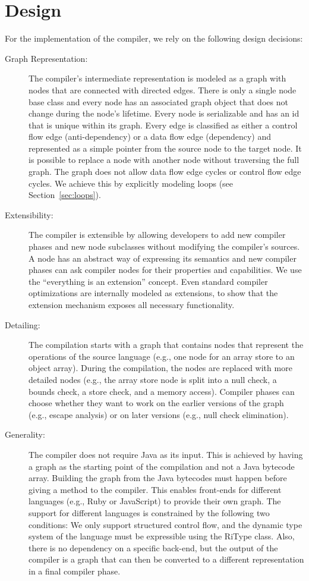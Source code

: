 \documentclass[twocolumn]{svjour3}
\begin{document}
\section{Design}
For the implementation of the compiler, we rely on the following design decisions:
\begin{description}
\item[Graph Representation:]
The compiler's intermediate representation is modeled as a graph with nodes that are connected with directed edges.
There is only a single node base class and every node has an associated graph object that does not change during the node's lifetime.
Every node is serializable and has an id that is unique within its graph.
Every edge is classified as either a control flow edge (anti-dependency) or a data flow edge (dependency) and represented as a simple pointer from the source node to the target node.
It is possible to replace a node with another node without traversing the full graph.
The graph does not allow data flow edge cycles or control flow edge cycles.
We achieve this by explicitly modeling loops (see Section~\ref{sec:loops}). 
\item[Extensibility:]
The compiler is extensible by allowing developers to add new compiler phases and new node subclasses without modifying the compiler's sources.
A node has an abstract way of expressing its semantics and new compiler phases can ask compiler nodes for their properties and capabilities.
We use the ``everything is an extension'' concept.
Even standard compiler optimizations are internally modeled as extensions, to show that the extension mechanism exposes all necessary functionality.
\item[Detailing:]
The compilation starts with a graph that contains nodes that represent the operations of the source language (e.g., one node for an array store to an object array).
During the compilation, the nodes are replaced with more detailed nodes (e.g., the array store node is split into a null check, a bounds check, a store check, and a memory access).
Compiler phases can choose whether they want to work on the earlier versions of the graph (e.g., escape analysis) or on later versions (e.g., null check elimination).
\item[Generality:]
The compiler does not require Java as its input.
This is achieved by having a graph as the starting point of the compilation and not a Java bytecode array.
Building the graph from the Java bytecodes must happen before giving a method to the compiler.
This enables front-ends for different languages (e.g., Ruby or JavaScript) to provide their own graph.
The support for different languages is constrained by the following two conditions: We only support structured control flow, and the dynamic type system of the language must be expressible using the RiType class.
Also, there is no dependency on a specific back-end, but the output of the compiler is a graph that can then be converted to a different representation in a final compiler phase.
\end{description}
\end{document}
